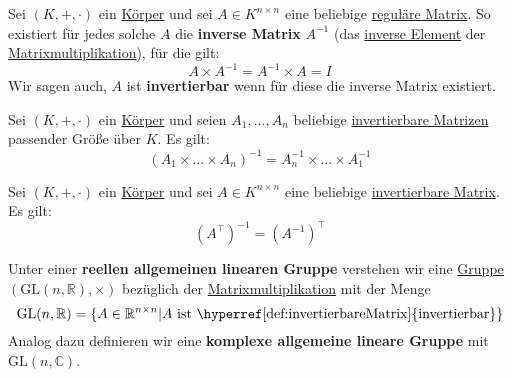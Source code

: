 \documentclass[../../main.tex]{subfiles}
\begin{document}
	\begin{definition}
		\label{def:InverseMatrix}
		\label{def:invertierbareMatrix}
		Sei $(K,+,\cdot)$ ein \hyperref[def:Körper]{Körper} und sei $A\in K^{n \times n}$ eine beliebige \hyperref[def:reguläreMatrix]{reguläre Matrix}. So existiert für jedes solche $A$ die \textbf{inverse Matrix} $A^{-1}$ (das \hyperref[def:inversesElement]{inverse Element} der \hyperref[def:Matrixmultiplikation]{Matrixmultiplikation}), für die gilt: $$A \times A^{-1} = A^{-1} \times A = I$$
		Wir sagen auch, $A$ ist \textbf{invertierbar} wenn für diese die inverse Matrix existiert. 
	\end{definition}

	\begin{theorem}
		Sei $(K,+,\cdot)$ ein \hyperref[def:Körper]{Körper} und seien $A_1, ..., A_n$ beliebige \hyperref[def:invertierbareMatrix]{invertierbare Matrizen} passender Größe über $K$. Es gilt: $$(A_1 \times ... \times A_n)^{-1} = A_n^{-1} \times ... \times A_1^{-1}$$
	\end{theorem}

	\begin{theorem}
		Sei $(K,+,\cdot)$ ein \hyperref[def:Körper]{Körper} und sei $A \in K^{n \times n}$ eine beliebige \hyperref[def:invertierbareMatrix]{invertierbare Matrix}. Es gilt: $$(A^\top)^{-1} = (A^{-1})^\top$$
	\end{theorem}

	\begin{definition}
		Unter einer \textbf{reellen allgemeinen linearen Gruppe} verstehen wir eine \hyperref[def:Gruppe]{Gruppe} $(\textrm{GL}(n,\mathbb{R}),\times)$ bezüglich der \hyperref[def:Matrixmultiplikation]{Matrixmultiplikation} mit der Menge $$\textrm{GL}(n,\mathbb{R}) = \{A \in \mathbb{R}^{n\times n} | A \textrm{ ist \hyperref[def:invertierbareMatrix]{invertierbar}} \}$$
		Analog dazu definieren wir eine \textbf{komplexe allgemeine lineare Gruppe} mit $\textrm{GL}(n, \mathbb{C})$. 
	\end{definition}
	
\end{document}
